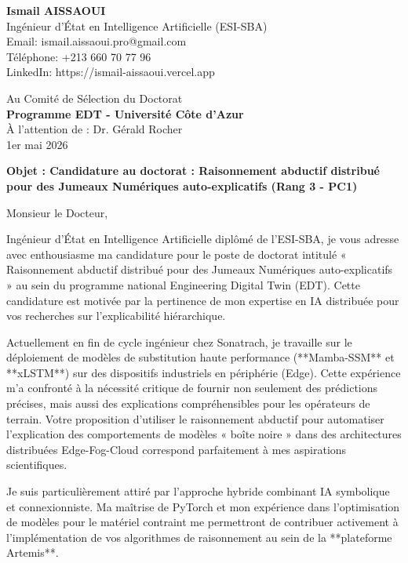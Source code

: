 \documentclass[11pt,a4paper]{article}
\begin{document}
\noindent \textbf{Ismail AISSAOUI} \\
Ingénieur d'État en Intelligence Artificielle (ESI-SBA) \\
Email: ismail.aissaoui.pro@gmail.com \\
Téléphone: +213 660 70 77 96 \\
LinkedIn: https://ismail-aissaoui.vercel.app

\bigskip

\begin{flushright}
    Au Comité de Sélection du Doctorat \\
    \textbf{Programme EDT - Université Côte d'Azur} \\
    À l'attention de : Dr. Gérald Rocher \\
    \medskip
    1er mai 2026
\end{flushright}

\bigskip

\noindent \textbf{Objet : Candidature au doctorat : Raisonnement abductif distribué pour des Jumeaux Numériques auto-explicatifs (Rang 3 - PC1)}

\bigskip

Monsieur le Docteur,

Ingénieur d'État en Intelligence Artificielle diplômé de l'ESI-SBA, je vous adresse avec enthousiasme ma candidature pour le poste de doctorat intitulé « Raisonnement abductif distribué pour des Jumeaux Numériques auto-explicatifs » au sein du programme national Engineering Digital Twin (EDT). Cette candidature est motivée par la pertinence de mon expertise en IA distribuée pour vos recherches sur l'explicabilité hiérarchique.

Actuellement en fin de cycle ingénieur chez Sonatrach, je travaille sur le déploiement de modèles de substitution haute performance (**Mamba-SSM** et **xLSTM**) sur des dispositifs industriels en périphérie (Edge). Cette expérience m'a confronté à la nécessité critique de fournir non seulement des prédictions précises, mais aussi des explications compréhensibles pour les opérateurs de terrain. Votre proposition d'utiliser le raisonnement abductif pour automatiser l'explication des comportements de modèles « boîte noire » dans des architectures distribuées Edge-Fog-Cloud correspond parfaitement à mes aspirations scientifiques.

Je suis particulièrement attiré par l'approche hybride combinant IA symbolique et connexionniste. Ma maîtrise de PyTorch et mon expérience dans l'optimisation de modèles pour le matériel contraint me permettront de contribuer activement à l'implémentation de vos algorithmes de raisonnement au sein de la **plateforme Artemis**.
\end{document}
